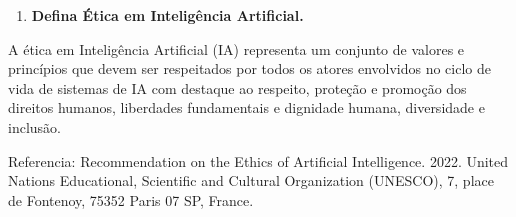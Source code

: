 \begin{enumerate}\bfseries
    \item \textbf{Defina Ética em Inteligência Artificial. }
\end{enumerate}

A ética em Inteligência Artificial (IA) representa um conjunto de valores e princípios que devem ser respeitados por todos os atores envolvidos no ciclo de vida de sistemas de IA com destaque ao respeito, proteção e promoção dos direitos humanos, liberdades fundamentais e dignidade humana, diversidade e inclusão.

Referencia: Recommendation on the Ethics of Artificial Intelligence. 2022. United Nations Educational, Scientific and Cultural Organization (UNESCO), 7, place de Fontenoy, 75352 Paris 07 SP, France.
